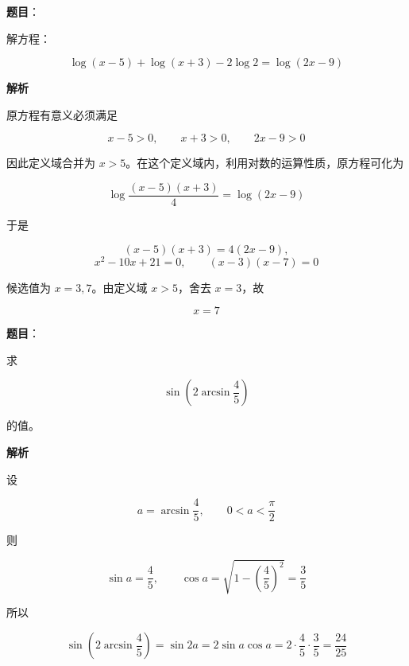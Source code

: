 \begin{answer}

\textbf{题目}：

解方程：

\nopagebreak[4]
\[
\log(x-5)+\log(x+3)-2\log2=\log(2x-9)
\]

\textbf{解析}

原方程有意义必须满足

\nopagebreak[4]
\[
x-5>0,
\qquad x+3>0,
\qquad 2x-9>0
\]

因此定义域合并为 $x>5$。在这个定义域内，利用对数的运算性质，原方程可化为

\nopagebreak[4]
\[
\log\frac{(x-5)(x+3)}4=\log(2x-9)
\]

于是

\nopagebreak[4]
\[
(x-5)(x+3)=4(2x-9),
\]
\nopagebreak[4]
\[
x^2-10x+21=0,
\qquad (x-3)(x-7)=0
\]

候选值为 $x=3,7$。由定义域 $x>5$，舍去 $x=3$，故

\nopagebreak[4]
\[
x=7
\]


\end{answer}
\begin{answer}

\textbf{题目}：

求

\nopagebreak[4]
\[
\sin\left(2\arcsin\frac45\right)
\]

的值。

\textbf{解析}

设

\nopagebreak[4]
\[
a=\arcsin\frac45,
\qquad 0<a<\frac\pi2
\]

则

\nopagebreak[4]
\[
\sin a=\frac45,
\qquad \cos a=\sqrt{1-\left(\frac45\right)^2}=\frac35
\]

所以

\nopagebreak[4]
\[
\sin\left(2\arcsin\frac45\right)
=\sin2a
=2\sin a\cos a
=2\cdot\frac45\cdot\frac35
=\frac{24}{25}
\]


\end{answer}

